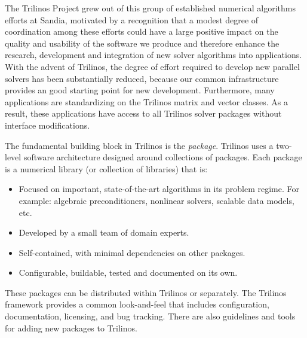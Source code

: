 \documentclass[acmtoms,acmnow]{acmtrans2m}
\begin{document}
The Trilinos Project grew out of this group of established numerical algorithms
efforts at Sandia, motivated by  a recognition that a modest degree of 
coordination among these efforts could have a large positive impact on 
the quality and usability of the software we produce and therefore enhance the
research, development and integration of new solver algorithms into
applications.  With the advent of Trilinos, the degree of effort required 
to develop new parallel solvers has been 
substantially reduced, because our common infrastructure provides an good 
starting point for new development.  Furthermore, many applications 
are standardizing on the 
Trilinos matrix and vector classes.  As a result, these applications
have access to all Trilinos solver packages without  
interface modifications. 

The fundamental building block in Trilinos is the {\it package}. Trilinos
uses a two-level software architecture designed around collections of
packages.  Each package is a numerical library (or collection of
libraries) that is:
\begin{itemize}
\item Focused on important, state-of-the-art algorithms in its problem
regime.  For example: algebraic preconditioners, nonlinear solvers, 
scalable data models, etc.
\item Developed by a small team of domain experts.
\item Self-contained, with minimal dependencies on other packages.
\item Configurable, buildable, tested and documented on its own.
\end{itemize}
These packages can be distributed within Trilinos or separately. 
The Trilinos framework provides a common look-and-feel that 
includes configuration, documentation, licensing, and bug 
tracking.  There are also guidelines and tools for adding new packages 
to Trilinos. 
\end{document}
